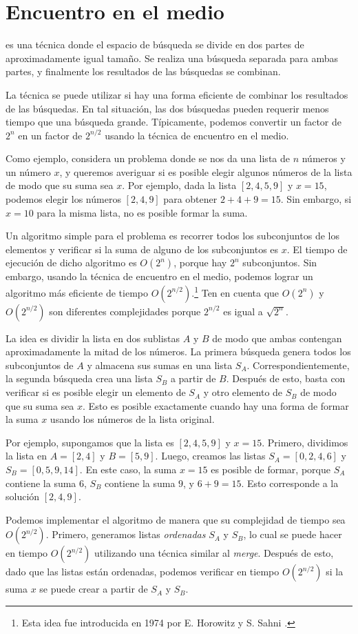 \section{Encuentro en el medio}


 es una técnica
donde el espacio de búsqueda se divide en
dos partes de aproximadamente igual tamaño.
Se realiza una búsqueda separada
para ambas partes,
y finalmente los resultados de las búsquedas se combinan.

La técnica se puede utilizar
si hay una forma eficiente de combinar los
resultados de las búsquedas.
En tal situación, las dos búsquedas pueden requerir menos
tiempo que una búsqueda grande.
Típicamente, podemos convertir un factor de $2^n$
en un factor de $2^{n/2}$ usando la técnica de encuentro en el
medio.

Como ejemplo, considera un problema donde
se nos da una lista de $n$ números y
un número $x$,
y queremos averiguar si es posible
elegir algunos números de la lista de modo que
su suma sea $x$.
Por ejemplo, dada la lista $[2,4,5,9]$ y $x=15$,
podemos elegir los números $[2,4,9]$ para obtener $2+4+9=15$.
Sin embargo, si $x=10$ para la misma lista,
no es posible formar la suma.

Un algoritmo simple para el problema es recorrer
todos los subconjuntos de los elementos y
verificar si la suma de alguno de los subconjuntos es $x$.
El tiempo de ejecución de dicho algoritmo es $O(2^n)$,
porque hay $2^n$ subconjuntos.
Sin embargo, usando la técnica de encuentro en el medio,
podemos lograr un algoritmo más eficiente de tiempo $O(2^{n/2})$.\footnote{Esta
    idea fue introducida en 1974 por E. Horowitz y S. Sahni \cite{hor74}.}
Ten en cuenta que $O(2^n)$ y $O(2^{n/2})$ son diferentes
complejidades porque $2^{n/2}$ es igual a $\sqrt{2^n}$.

La idea es dividir la lista en
dos sublistas $A$ y $B$ de modo que ambas
contengan aproximadamente la mitad de los números.
La primera búsqueda genera todos los subconjuntos
de $A$ y almacena sus sumas en una lista $S_A$.
Correspondientemente, la segunda búsqueda crea
una lista $S_B$ a partir de $B$.
Después de esto, basta con verificar si es posible
elegir un elemento de $S_A$ y otro
elemento de $S_B$ de modo que su suma sea $x$.
Esto es posible exactamente cuando hay una forma de
formar la suma $x$ usando los números de la lista original.

Por ejemplo, supongamos que la lista es $[2,4,5,9]$ y $x=15$.
Primero, dividimos la lista en $A=[2,4]$ y $B=[5,9]$.
Luego, creamos las listas
$S_A=[0,2,4,6]$ y $S_B=[0,5,9,14]$.
En este caso, la suma $x=15$ es posible de formar,
porque $S_A$ contiene la suma $6$,
$S_B$ contiene la suma $9$, y $6+9=15$.
Esto corresponde a la solución $[2,4,9]$.

Podemos implementar el algoritmo de manera que
su complejidad de tiempo sea $O(2^{n/2})$.
Primero, generamos listas \emph{ordenadas} $S_A$ y $S_B$,
lo cual se puede hacer en tiempo $O(2^{n/2})$ utilizando
una técnica similar al \textit{merge}.
Después de esto, dado que las listas están ordenadas,
podemos verificar en tiempo $O(2^{n/2})$ si
la suma $x$ se puede crear a partir de $S_A$ y $S_B$.
